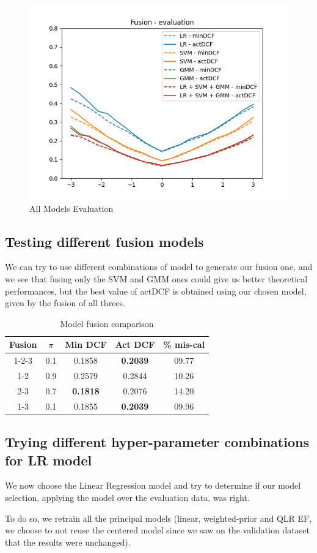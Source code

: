 \documentclass[12pt, a4paper]{article}
\begin{document}
\begin{figure}[ht]
	\centering
	\includegraphics[width=.4\textwidth]{project11/evaluation}
	\caption{All Models Evaluation}
	\label{fig:Model_Evaluation}
\end{figure}

\subsection{Testing different fusion models}
We can try to use different combinations of model to generate our fusion one, and we see that fusing only the SVM and GMM ones could give us better theoretical performances, but the best value of actDCF is obtained using our chosen model, given by the fusion of all threes.

\begin{table}[ht!]
	\centering
 	\begin{tabular}{| | c c c c c | |} 
 		\hline
 		Fusion & $\pi$ & Min DCF & Act DCF & \% mis-cal\\
 		\hline\hline
 		1-2-3 & 0.1 & 0.1858 & \textbf{0.2039} & 09.77\\
 		\hline
 		1-2 & 0.9 & 0.2579 & 0.2844 & 10.26\\
 		\hline
 		2-3 & 0.7 & \textbf{0.1818} & 0.2076 & 14.20\\
 		\hline
 		1-3 & 0.1 &  0.1855 & \textbf{0.2039} & 09.96\\
 		\hline
 	\end{tabular}
	\caption{Model fusion comparison}
\end{table}

\subsection{Trying different hyper-parameter combinations for LR model}
We now choose the Linear Regression model and try to determine if our model selection, applying the model over the evaluation data, was right. 

To do so, we retrain all the principal models (linear, weighted-prior and QLR EF, we choose to not reuse the centered model since we saw on the validation dataset that the results were unchanged).
\end{document}
